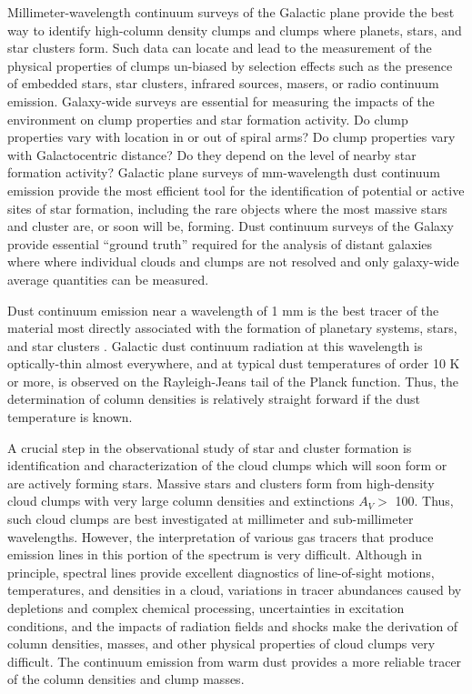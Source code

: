 \documentclass[12pt,preprint]{aastex}
\begin{document}
Millimeter-wavelength continuum surveys of the Galactic plane provide
the best way to identify high-column density clumps and clumps where
planets, stars, and star clusters form.  Such data can locate and lead
to the measurement of the physical properties of clumps un-biased by
selection effects such as the presence of embedded stars, star
clusters, infrared sources, masers, or radio continuum emission.
Galaxy-wide surveys are essential for measuring the impacts of the
environment on clump properties and star formation activity.  Do clump
properties vary with location in or out of spiral arms?  Do clump
properties vary with Galactocentric distance?  Do they depend on the
level of nearby star formation activity?  Galactic plane surveys of
mm-wavelength dust continuum emission provide the most efficient tool
for the identification of potential or active sites of star formation,
including the rare objects where the most massive stars and cluster
are, or soon will be, forming.  Dust continuum surveys of the Galaxy
provide essential ``ground truth'' required for the analysis of distant
galaxies where where individual clouds and clumps are not resolved and
only galaxy-wide average quantities can be measured.

Dust continuum emission near a wavelength of 1 mm is the best tracer
of the material most directly associated with the formation of
planetary systems, stars, and star clusters
\citep{johnstone06}.  Galactic dust continuum radiation at
this wavelength is optically-thin almost everywhere, and at typical
dust temperatures of order 10 K or more, is observed on the
Rayleigh-Jeans tail of the Planck function.  Thus, the determination
of column densities is relatively straight forward if the dust
temperature is known.

A crucial step in the observational study of star and cluster
formation is identification and characterization of the cloud clumps
which will soon form or are actively forming stars.  Massive stars and
clusters form from high-density cloud clumps with very large column
densities and extinctions $A_V > $ 100.  Thus, such cloud clumps are
best investigated at millimeter and sub-millimeter wavelengths.
However, the interpretation of various gas tracers that produce
emission lines in this portion of the spectrum is very difficult.
Although in principle, spectral lines provide excellent diagnostics of
line-of-sight motions, temperatures, and densities in a cloud,
variations in tracer abundances caused by depletions and complex
chemical processing, uncertainties in excitation conditions, and the
impacts of radiation fields and shocks make the derivation of column
densities, masses, and other physical properties of cloud clumps very
difficult.  The continuum emission from warm dust provides a more
reliable tracer of the column densities and clump masses.
\end{document}
